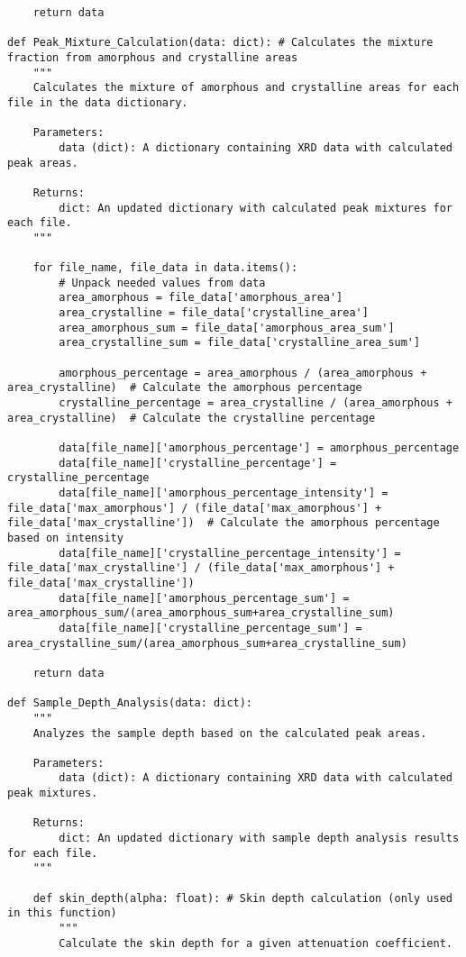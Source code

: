 \begin{small}
\begin{verbatim}
    return data

def Peak_Mixture_Calculation(data: dict): # Calculates the mixture fraction from amorphous and crystalline areas
    """
    Calculates the mixture of amorphous and crystalline areas for each file in the data dictionary.

    Parameters:
        data (dict): A dictionary containing XRD data with calculated peak areas.

    Returns:
        dict: An updated dictionary with calculated peak mixtures for each file.
    """

    for file_name, file_data in data.items():
        # Unpack needed values from data
        area_amorphous = file_data['amorphous_area']
        area_crystalline = file_data['crystalline_area']
        area_amorphous_sum = file_data['amorphous_area_sum']
        area_crystalline_sum = file_data['crystalline_area_sum']

        amorphous_percentage = area_amorphous / (area_amorphous + area_crystalline)  # Calculate the amorphous percentage
        crystalline_percentage = area_crystalline / (area_amorphous + area_crystalline)  # Calculate the crystalline percentage

        data[file_name]['amorphous_percentage'] = amorphous_percentage
        data[file_name]['crystalline_percentage'] = crystalline_percentage
        data[file_name]['amorphous_percentage_intensity'] = file_data['max_amorphous'] / (file_data['max_amorphous'] + file_data['max_crystalline'])  # Calculate the amorphous percentage based on intensity
        data[file_name]['crystalline_percentage_intensity'] = file_data['max_crystalline'] / (file_data['max_amorphous'] + file_data['max_crystalline'])
        data[file_name]['amorphous_percentage_sum'] = area_amorphous_sum/(area_amorphous_sum+area_crystalline_sum)
        data[file_name]['crystalline_percentage_sum'] = area_crystalline_sum/(area_amorphous_sum+area_crystalline_sum)

    return data

def Sample_Depth_Analysis(data: dict):
    """
    Analyzes the sample depth based on the calculated peak areas.

    Parameters:
        data (dict): A dictionary containing XRD data with calculated peak mixtures.

    Returns:
        dict: An updated dictionary with sample depth analysis results for each file.
    """

    def skin_depth(alpha: float): # Skin depth calculation (only used in this function)
        """
        Calculate the skin depth for a given attenuation coefficient.


\end{verbatim}
\end{small}
